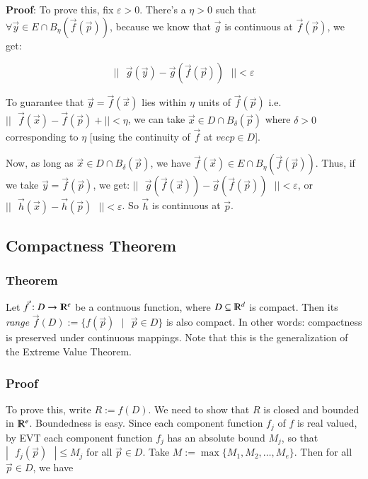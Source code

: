 \documentclass [12 pt, twoside] {book}
\newcommand\+{\text{ }}
\begin{document}
\textbf{Proof}:
To prove this, fix $\varepsilon > 0$. There's a $\eta > 0$ such that
$\forall \vec{y} \in E \cap B_\eta(\vec{f}(\vec{p}))$, because we know that
$\vec{g}$ is continuous at $\vec{f}(\vec{p})$, we get:

$$||\+\vec{g}(\vec{y}) - \vec{g}(\vec{f}(\vec{p}))\+|| < \varepsilon$$

To guarantee that $\vec{y} = \vec{f}(\vec{x})$ lies within $\eta$ units of
$\vec{f}(\vec{p})$ i.e. $||\+\vec{f}(\vec{x}) - \vec{f}(\vec{p})+|| < \eta$, we
can take $\vec{x} \in D \cap B_\delta(\vec{p})$ where $\delta > 0$ corresponding
to $\eta$ [using the continuity of $\vec{f}$ at $vec{p} \in D$].

Now, as long as $\vec{x} \in D \cap B_\delta(\vec{p})$, we have
$\vec{f}(\vec{x}) \in E \cap B_\eta(\vec{f}(\vec{p}))$. Thus, if we take
$\vec{y} = \vec{f}(\vec{p})$, we get: $||\+\vec{g}(\vec{f}(\vec{x})) -
\vec{g}(\vec{f}(\vec{p}))\+|| < \varepsilon$, or $||\+\vec{h}(\vec{x}) -
\vec{h}(\vec{p})\+|| < \varepsilon$. So $\vec{h}$ is continuous at $\vec{p}$.

\subsection{Compactness Theorem}

\subsubsection{Theorem}

Let $\vec{f} : D \to \varmathbb{R}^e$ be a contnuous function, where $D \subseteq
\varmathbb{R}^d$ is compact. Then its \textit{range} $\vec{f}(D) := \{f(\vec{p}) \+|\+
\vec{p} \in D\}$ is also compact. In other words: compactness is preserved under
continuous mappings. Note that this is the generalization of the Extreme Value
Theorem.

\subsubsection{Proof}

To prove this, write $R := f(D)$. We need to show that $R$ is closed and bounded
in $\varmathbb{R}^e$. Boundedness is easy. Since each component function $f_j$
of $f$ is real valued, by EVT each component function $f_j$ has an absolute
bound $M_j$, so that $|\+f_j(\vec{p})\+| \leq M_j$ for all $\vec{p} \in D$. 
Take $M := \max\{M_1, M_2, \dots, M_e\}$. Then for all $\vec{p} \in D$, we have
\end{document}

